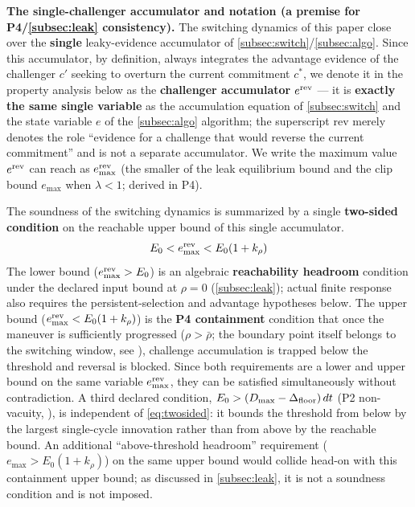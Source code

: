 \noindent\textbf{The single-challenger accumulator and notation (a premise for P4/\cref{subsec:leak} consistency).} The switching dynamics of this paper close over the \textbf{single} leaky-evidence accumulator of \cref{subsec:switch}/\cref{subsec:algo}. Since this accumulator, by definition, always integrates the advantage evidence of the challenger $c'$ seeking to overturn the current commitment $c^*$, we denote it in the property analysis below as the \textbf{challenger accumulator} $e^{\text{rev}}$ --- it is \textbf{exactly the same single variable} as the accumulation equation of \cref{subsec:switch} and the state variable $e$ of the \cref{subsec:algo} algorithm; the superscript rev merely denotes the role ``evidence for a challenge that would reverse the current commitment'' and is not a separate accumulator. We write the maximum value $e^{\text{rev}}$ can reach as $e^{\text{rev}}_{\max}$ (the smaller of the leak equilibrium bound and the clip bound $e_{\max}$ when $\lambda < 1$; derived in P4).

The soundness of the switching dynamics is summarized by a single \textbf{two-sided condition} on the reachable upper bound of this single accumulator.
\begin{equation}
E_0 < e^{\text{rev}}_{\max} < E_0(1 + k_\rho)
\label{eq:twosided}
\end{equation}
The lower bound ($e^{\text{rev}}_{\max} > E_0$) is an algebraic \textbf{reachability headroom} condition under the declared input bound at $\rho = 0$ (\cref{subsec:leak}); actual finite response also requires the persistent-selection and advantage hypotheses below. The upper bound ($e^{\text{rev}}_{\max} < E_0(1+k_\rho)$) is the \textbf{P4 containment} condition that once the maneuver is sufficiently progressed ($\rho > \bar\rho$; the boundary point itself belongs to the switching window, see ), challenge accumulation is trapped below the threshold and reversal is blocked. Since both requirements are a lower and upper bound on the same variable $e^{\text{rev}}_{\max}$, they can be satisfied simultaneously without contradiction. A third declared condition, $E_0 > (D_{\max}-\Delta_{\text{floor}})\,dt$ (P2 non-vacuity, ), is independent of \eqref{eq:twosided}: it bounds the threshold from below by the largest single-cycle innovation rather than from above by the reachable bound. An additional ``above-threshold headroom'' requirement ($e_{\max} > E_0(1+k_\rho)$) on the same upper bound would collide head-on with this containment upper bound; as discussed in \cref{subsec:leak}, it is not a soundness condition and is not imposed.

